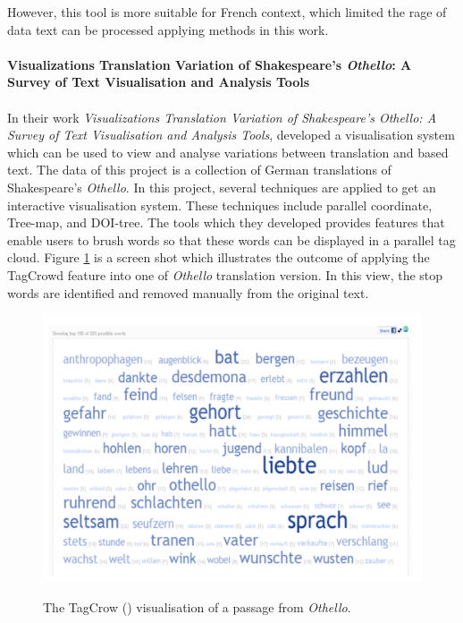 However, this tool is more suitable for French context, which limited the rage of data text can be processed applying methods in this work.

\paragraph{Visualizations Translation Variation of Shakespeare's \emph{Othello}: A Survey of Text Visualisation and Analysis Tools}
\paragraph[]{} In their work \emph{Visualizations Translation Variation of Shakespeare's \emph{Othello}: A Survey of Text Visualisation and Analysis Tools}, \cite{Geng2011} developed a visualisation system which can be used to view and analyse variations between translation and based text. The data of this project is a collection of German translations of Shakespeare's \emph{Othello}. In this project, several techniques are applied to get an interactive visualisation system. These techniques include parallel coordinate, Tree-map, and DOI-tree. The tools which they developed provides features that enable users to brush words so that these words can be displayed in a parallel tag cloud. Figure \ref{fig:tagCloud} is a screen shot which illustrates the outcome of applying the TagCrowd feature into one of \emph{Othello} translation version. In this view, the stop words are identified and removed manually from the original text.

\begin{figure}[H]
	\centering    
	\includegraphics[scale=1]{Figs/Tagcloud}\\[1ex]
	\caption{The TagCrow (\cite{TagCrowd}) visualisation of a passage from \emph{Othello}.}
	\label{fig:tagCloud}
\end{figure} 

